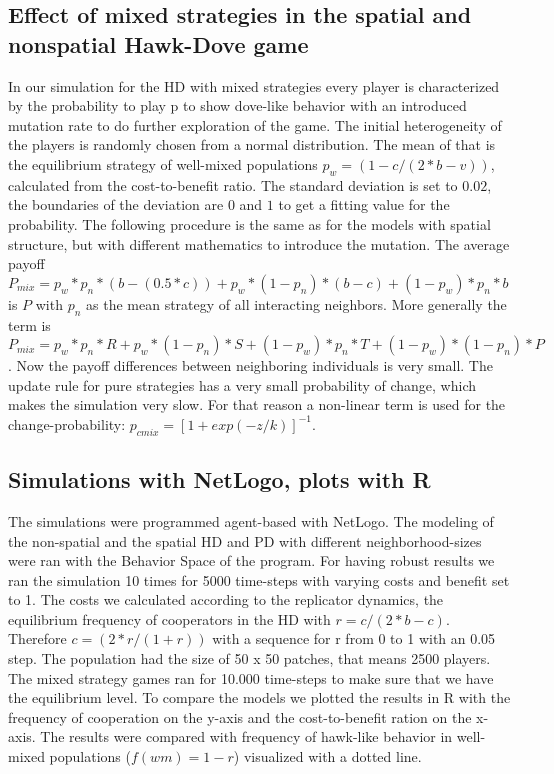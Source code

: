 \subsection{Effect of mixed strategies in the spatial and nonspatial Hawk-Dove game}
In our simulation for the HD with mixed strategies every player is characterized by the probability to play p to show dove-like behavior with an introduced mutation rate to do further exploration of the game. The initial heterogeneity of the players is randomly chosen from a normal distribution. The mean of that is the  equilibrium strategy of well-mixed populations $p_{w} = (1-c/(2*b-v))$, calculated from the cost-to-benefit ratio. The standard deviation is set to $0.02$, the boundaries of the deviation are $0$ and $1$ to get a fitting value for the probability. The following procedure is the same as for the models with spatial structure, but with different mathematics to introduce the mutation. The average payoff $P_{mix} = p_{w}*p_{n}*(b-(0.5*c))+ p_{w}*(1-p_{n})*(b-c)+(1-p_{w})*p_{n}*b$ is $P$ with $p_n$ as the mean strategy of all interacting neighbors. More generally the term is $P_{mix}  = p_{w}*p_{n}*R+ p_{w}*(1-p_{n})*S+(1-p_{w})*p_{n}*T+(1-p_{w})*(1-p_{n})*P$. Now the  payoff differences between neighboring individuals is very small. The update rule for pure strategies has a very small probability of change, which makes the simulation very slow. For that reason a non-linear term is used for the change-probability: $p_{cmix} = [1 + exp(-z/k)]^{-1}$.

\subsection{Simulations with NetLogo, plots with R}
The simulations were programmed agent-based with NetLogo. The modeling of the non-spatial and the spatial HD and PD with different neighborhood-sizes were ran with the Behavior Space of the program. For having robust results we ran the simulation 10 times for 5000 time-steps with varying costs and benefit set to 1. The costs we calculated according to the replicator dynamics, the equilibrium frequency of cooperators in the HD with $r=c/(2*b-c)$. Therefore $c=(2*r/(1+r))$ with a sequence for r from 0 to 1 with an 0.05 step. The population had the size  of 50 x 50 patches, that means 2500 players. The mixed strategy games ran for 10.000 time-steps to make sure that we have the equilibrium level. To compare the models we plotted the results in R with the frequency of cooperation on the y-axis and the cost-to-benefit ration on the x-axis. The results were compared with frequency of hawk-like behavior in well-mixed populations ($f(wm)=1-r$) visualized with a dotted line.

